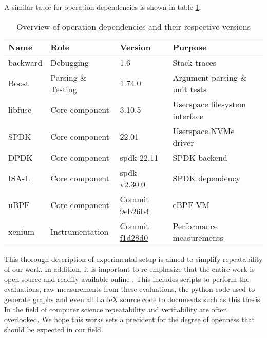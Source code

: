 A similar table for operation dependencies is shown in table
\ref{table:operationdepdencies}.

\begin{table}
    \caption{Overview of operation dependencies and their respective versions}
    \centering
    \begin{adjustbox}{width=1\textwidth}
        \begin{threeparttable}[]
            \begin{tabular}{lllll}
                \toprule
                \textbf{Name} & \textbf{Role} & \textbf{Version} & \textbf{Purpose} \\
                \midrule
                backward & Debugging & 1.6 & Stack traces \\
                Boost & Parsing \& Testing & 1.74.0 & Argument parsing \& unit tests \\
                libfuse & Core component & 3.10.5 & Userspace filesystem interface \\
                SPDK & Core component & 22.01 & Userspace NVMe driver \\
                DPDK & Core component & spdk-22.11 & SPDK backend \\
                ISA-L & Core component & spdk-v2.30.0 & SPDK dependency \\
                uBPF & Core component & Commit \href{https://github.com/iovisor/ubpf/commit/9eb26b4bfdec6cafbf629a056155363f12cec972}{9eb26b4} & eBPF VM \\
                xenium & Instrumentation & Commit \href{https://github.com/mpoeter/xenium/commit/f1d28d0980cf2128c3f6b77d321aad5ca469dbce}{f1d28d0} & Performance measurements \\
                \bottomrule
            \end{tabular}
        \end{threeparttable}
        \label{table:operationdepdencies}
    \end{adjustbox}
\end{table}

This thorough description of experimental setup is aimed to simplify
repeatability of our work. In addition, it is important to re-emphasize that the
entire work is open-source and readily available online \cite{qemu-csd}. This
includes scripts to perform the evaluations, raw measurements from these
evaluations, the python code used to generate graphs and even all LaTeX source
code to documents such as this thesis. In the field of computer science
repeatability and verifiability are often overlooked. We hope this works sets a
precident for the degree of openness that should be expected in our field.


